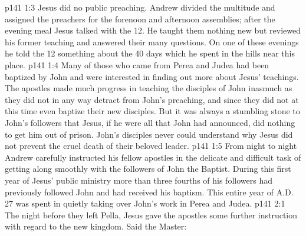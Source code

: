 \vs p141 1:3 Jesus did no public preaching. Andrew divided the multitude and assigned the preachers for the forenoon and afternoon assemblies; after the evening meal Jesus talked with the 12. He taught them nothing new but reviewed his former teaching and answered their many questions. On one of these evenings he told the 12 something about the 40 days which he spent in the hills near this place.
\vs p141 1:4 Many of those who came from Perea and Judea had been baptized by John and were interested in finding out more about Jesus’ teachings. The apostles made much progress in teaching the disciples of John inasmuch as they did not in any way detract from John’s preaching, and since they did not at this time even baptize their new disciples. But it was always a stumbling stone to John’s followers that Jesus, if he were all that John had announced, did nothing to get him out of prison. John’s disciples never could understand why Jesus did not prevent the cruel death of their beloved leader.
\vs p141 1:5 From night to night Andrew carefully instructed his fellow apostles in the delicate and difficult task of getting along smoothly with the followers of John the Baptist. During this first year of Jesus’ public ministry more than three fourths of his followers had previously followed John and had received his baptism. This entire year of A.D.\,27 was spent in quietly taking over John’s work in Perea and Judea.
\vs p141 2:1 The night before they left Pella, Jesus gave the apostles some further instruction with regard to the new kingdom. Said the Master: 
